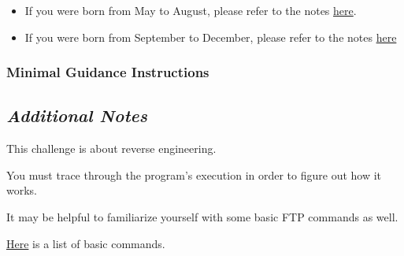 {{{\begin{itemize}
                        \item If you were born from May to August, please refer to the notes \href{https://github.com/brendonky18/Honors-Thesis.CTFs/blob/main/going-backwards/notes_1.md}{here}.



                        \item If you were born from September to December, please refer to the notes \href{https://github.com/brendonky18/Honors-Thesis.CTFs/blob/main/going-backwards/notes_1.md}{here}



                    \end{itemize}







            }



        \newpage



        \subsubsection{Minimal Guidance Instructions}



            {\parindent0pt\singlespacing



                \subsection*{\textit{Additional Notes}}



                    This challenge is about reverse engineering. %



You must trace through the program's execution in order to figure out how it works. %



It may be helpful to familiarize yourself with some basic FTP commands as well. 







                    \href{https://kb.iu.edu/d/aenq}{Here} is a list of basic commands.







}}}
